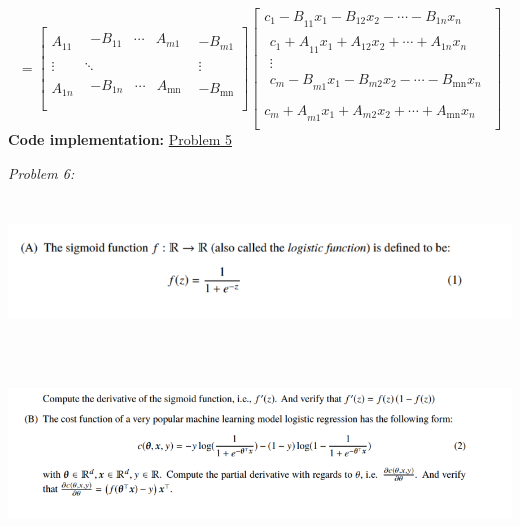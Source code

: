\documentclass[
]{article}
\begin{document}
\[= \begin{bmatrix}
A_{11} & \begin{matrix}
 - B_{11} & \cdots & A_{m1} \\
\end{matrix} & - B_{m1} \\
 \vdots & \ddots & \vdots \\
A_{1n} & \begin{matrix}
 - B_{1n} & \cdots & A_{\text{mn}} \\
\end{matrix} & - B_{\text{mn}} \\
\end{bmatrix}\begin{bmatrix}
{c_{1} - B}_{11}x_{1} - B_{12}x_{2} - \cdots - B_{1n}x_{n} \\
\begin{matrix}
{c_{1} + A}_{11}x_{1} + A_{12}x_{2} + \cdots + A_{1n}x_{n} \\
 \vdots \\
{c_{m} - B}_{m1}x_{1} - B_{m2}x_{2} - \cdots - B_{\text{mn}}x_{n} \\
\end{matrix} \\
{c_{m} + A}_{m1}x_{1} + A_{m2}x_{2} + \cdots + A_{\text{mn}}x_{n} \\
\end{bmatrix}\]
\textbf{Code implementation:} \href{https://colab.research.google.com/github/dtungpka/Applied-Mathematics-for-Artificial-Intelligence/blob/main/Assignment_3/Assignment%203.ipynb#scrollTo=Problem_5}{Problem 5}

\newpage
\emph{Problem 6:}\\
\includegraphics[width=6.49167in,height=1.84167in]{image6.png}\\
\includegraphics[width=6.49167in,height=1.84167in]{image7.png}\\
\end{document}
